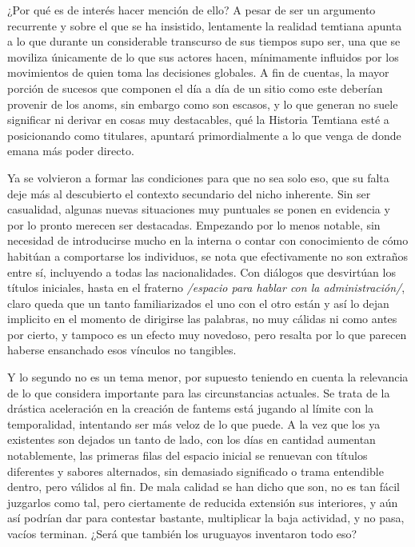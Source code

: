 \documentclass[
]{book}
\begin{document}
¿Por qué es de interés hacer mención de ello? A pesar de ser un argumento recurrente y sobre el que se ha insistido, lentamente la realidad temtiana apunta a lo que durante un considerable transcurso de sus tiempos supo ser, una que se moviliza únicamente de lo que sus actores hacen, mínimamente influidos por los movimientos de quien toma las decisiones globales. A fin de cuentas, la mayor porción de sucesos que componen el día a día de un sitio como este deberían provenir de los anoms, sin embargo como son escasos, y lo que generan no suele significar ni derivar en cosas muy destacables, qué la Historia Temtiana esté a posicionando como titulares, apuntará primordialmente a lo que venga de donde emana más poder directo.

Ya se volvieron a formar las condiciones para que no sea solo eso, que su falta deje más al descubierto el contexto secundario del nicho inherente. Sin ser casualidad, algunas nuevas situaciones muy puntuales se ponen en evidencia y por lo pronto merecen ser destacadas. Empezando por lo menos notable, sin necesidad de introducirse mucho en la interna o contar con conocimiento de cómo habitúan a comportarse los individuos, se nota que efectivamente no son extraños entre sí, incluyendo a todas las nacionalidades. Con diálogos que desvirtúan los títulos iniciales, hasta en el fraterno \emph{/espacio para hablar con la administración/}, claro queda que un tanto familiarizados el uno con el otro están y así lo dejan implicito en el momento de dirigirse las palabras, no muy cálidas ni como antes por cierto, y tampoco es un efecto muy novedoso, pero resalta por lo que parecen haberse ensanchado esos vínculos no tangibles.

Y lo segundo no es un tema menor, por supuesto teniendo en cuenta la relevancia de lo que considera importante para las circunstancias actuales. Se trata de la drástica aceleración en la creación de fantems está jugando al límite con la temporalidad, intentando ser más veloz de lo que puede. A la vez que los ya existentes son dejados un tanto de lado, con los días en cantidad aumentan notablemente, las primeras filas del espacio inicial se renuevan con títulos diferentes y sabores alternados, sin demasiado significado o trama entendible dentro, pero válidos al fin. De mala calidad se han dicho que son, no es tan fácil juzgarlos como tal, pero ciertamente de reducida extensión sus interiores, y aún así podrían dar para contestar bastante, multiplicar la baja actividad, y no pasa, vacíos terminan. ¿Será que también los uruguayos inventaron todo eso?
\end{document}
